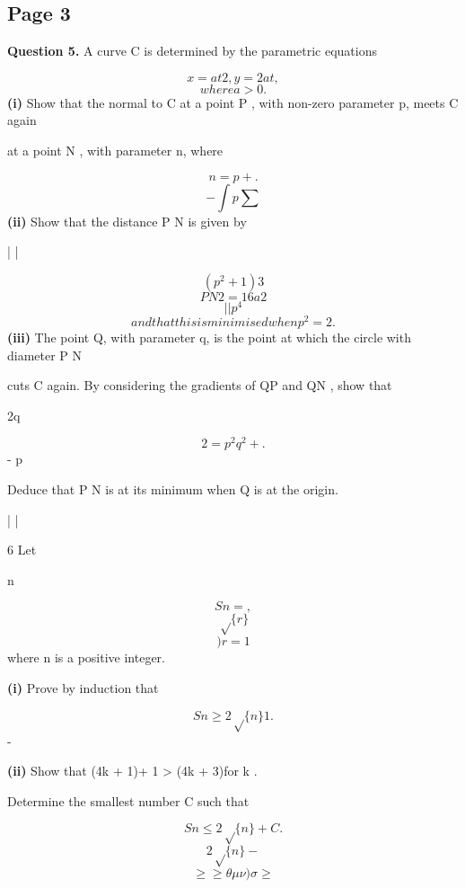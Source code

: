 \documentclass[12pt]{article}
\begin{document}
\subsection*{Page 3}
\begin{flushleft}
\bigskip\textbf{Question 5.} A curve C is determined by the parametric equations\par
\[x = at2 , y = 2at ,\]
\[where a > 0 .\]
\textbf{(i)} Show that the normal to C at a point P , with non-zero parameter p, meets C again\par
at a point N , with parameter n, where\par
\[n = p + .\]
\[- \int p \sum\]
\textbf{(ii)} Show that the distance P N is given by\par
| |\par
\[(p^2 + 1)3\]
\[P N 2 = 16a2\]
\[| | p^4\]
\[and that this is minimised when p^2 = 2 .\]
\textbf{(iii)} The point Q, with parameter q, is the point at which the circle with diameter P N\par
cuts C again. By considering the gradients of QP and QN , show that\par
2q\par
\[2 = p^2 q^2 + .\]
- p\par
Deduce that P N is at its minimum when Q is at the origin.\par
| |\par
6 Let\par
n\par
\[Sn = ,\]
\[\sqrt\{r\}\]
\[)r=1\]
where n is a positive integer.\par
\textbf{(i)} Prove by induction that\par
\[Sn \geq 2\sqrt\{n\} 1 .\]
-\par
\textbf{(ii)} Show that (4k + 1)\sqrtk + 1 > (4k + 3)\sqrtk for k  .\par
Determine the smallest number C such that\par
\[Sn \leq 2\sqrt\{n\} + C .\]
\[2\sqrt\{n\} -\]
\[\geq\geq\theta\mu\nu) \sigma \geq\]
\end{flushleft}
\end{document}
